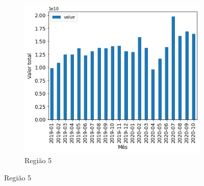 \begin{figure}[htb]
    \begin{subfigure}[b]{0.45\textwidth} 
        \includegraphics[scale=0.45]{images/base-de-dados-12.5-valor-mensal-por-regiao.png}
        \caption{Região 5}
        \label{fig:pandemia:descritiva-12.5-valor-mensal-por-regiao}
    \end{subfigure}
    \fautor
\end{figure}

